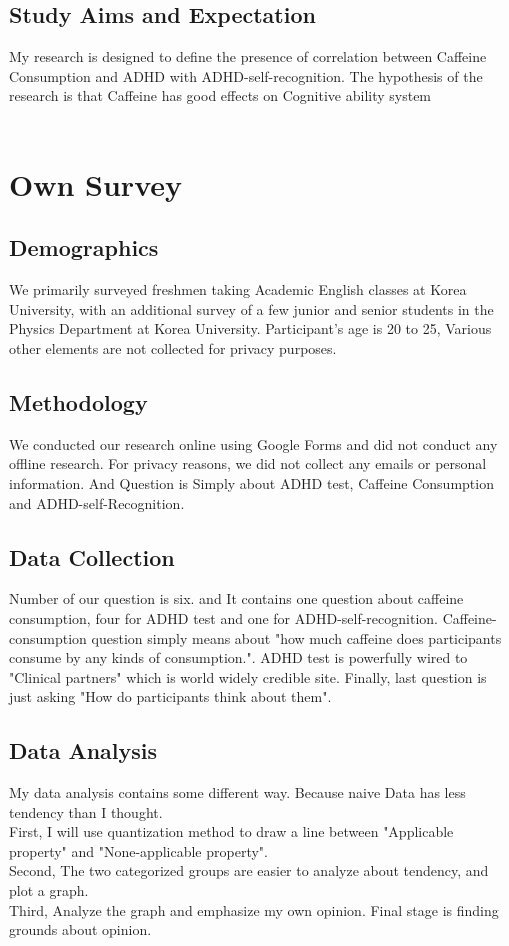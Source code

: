 \documentclass[12pt]{article}
\begin{document}
\subsection{Study Aims and Expectation}

\quad My research is designed to define the presence of correlation between Caffeine Consumption and ADHD with ADHD-self-recognition. The hypothesis of the research is that Caffeine has good effects on Cognitive ability system 
\\
\\

\section{Own Survey}
\subsection{Demographics}
 \quad We primarily surveyed freshmen taking Academic English classes at Korea University, with an additional survey of a few junior and senior students in the Physics Department at Korea University. Participant's age is 20 to 25, Various other elements are not collected for privacy purposes.

\subsection{Methodology}
\quad We conducted our research online using Google Forms and did not conduct any offline research. For privacy reasons, we did not collect any emails or personal information. And Question is Simply about ADHD test, Caffeine Consumption and ADHD-self-Recognition.

\subsection{Data Collection}
\quad Number of our question is six. and It contains one question about caffeine consumption, four for ADHD test and one for ADHD-self-recognition. Caffeine-consumption question simply means about "how much caffeine does participants consume by any kinds of consumption.". ADHD test is powerfully wired to "Clinical partners" which is world widely credible site. Finally, last question is just asking "How do participants think about them".
\subsection{Data Analysis}
\quad My data analysis contains some different way. Because naive Data has less tendency than I thought. 
\\
First, I will use  quantization method to draw a line between "Applicable property" and "None-applicable property".
\\
Second, The two categorized groups are easier to analyze about tendency, and plot a graph.
\\
Third, Analyze the graph and emphasize my own opinion. Final stage is finding grounds about opinion.
\newpage
\end{document}
